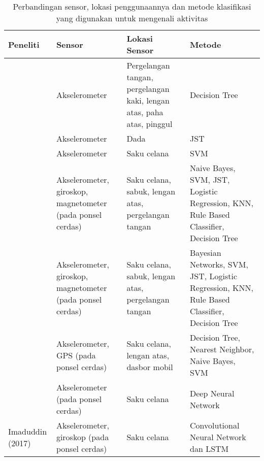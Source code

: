 \begin{table}[p!]
    \centering
    \caption{Perbandingan sensor, lokasi penggunaannya dan metode klasifikasi yang digunakan untuk mengenali aktivitas}
    \begin{tabular}{ |L{2cm}|L{3cm}|L{4.2cm}|L{3cm}| }
        \hline
        \textbf{Peneliti} & \textbf{Sensor} & \textbf{Lokasi Sensor} & \textbf{Metode} \\

        \hline
        \Textcite{tapia-2007} & Akselerometer & Pergelangan tangan, pergelangan kaki, lengan atas, paha atas, pinggul & Decision Tree \\

        \hline
        \Textcite{khan-2010} & Akselerometer & Dada & JST \\

        \hline
        \Textcite{he-2008} & Akselerometer & Saku celana & SVM \\

        \hline
        \Textcite{shoaib-2013} & Akselerometer, giroskop, magnetometer (pada ponsel cerdas) & Saku celana, sabuk, lengan atas, pergelangan tangan & Naive Bayes, SVM, JST, Logistic Regression, KNN, Rule Based Classifier, Decision Tree \\

        \hline
        \Textcite{shoaib-2014} & Akselerometer, giroskop, magnetometer (pada ponsel cerdas) & Saku celana, sabuk, lengan atas, pergelangan tangan & Bayesian Networks, SVM, JST, Logistic Regression, KNN, Rule Based Classifier, Decision Tree \\

        \hline
        \Textcite{Chiang-201413} & Akselerometer, GPS (pada ponsel cerdas) & Saku celana, lengan atas, dasbor mobil & Decision Tree, Nearest Neighbor, Naive Bayes, SVM \\

        \hline
        \Textcite{zhang-2015} & Akselerometer (pada ponsel cerdas) & Saku celana & Deep Neural Network \\

        \hline
        Imaduddin (2017) & Akselerometer, giroskop (pada ponsel cerdas) & Saku celana & Convolutional Neural Network dan LSTM \\

        \hline
    \end{tabular}
    \label{table:perbandingan-pustaka}
\end{table}
